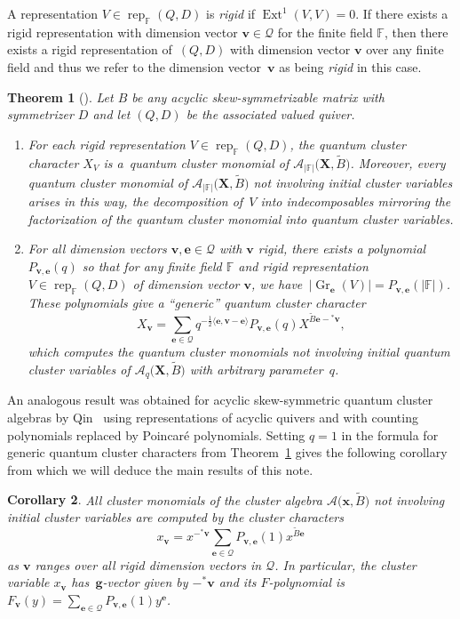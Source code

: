 \documentclass[pdftex]{sigma}
\newcommand{\bfe}{\mathbf{e}}
\newcommand{\bfg}{\mathbf{g}}
\newcommand{\bfv}{\mathbf{v}}
\newcommand{\bfx}{\mathbf{x}}
\newcommand{\bfX}{\mathbf{X}}
\newcommand{\cA}{\mathcal{A}}
\newcommand{\cQ}{\mathcal{Q}}
\newcommand{\FF}{\mathbb{F}}
\newcommand{\Ext}{\operatorname{Ext}}
\newcommand{\Gr}{\operatorname{Gr}}
\newcommand{\half}{{\frac{1}{2}}}
\newcommand{\rep}{\operatorname{rep}}
\numberwithin{equation}{section}
\newtheorem{Theorem}{Theorem}
\newtheorem{Corollary}[Theorem]{Corollary}
\begin{document}
 A representation $V\in\rep_\FF(Q,D)$ is {\it rigid} if $\Ext^1(V,V)=0$. If there exists a rigid representation with dimension vector $\bfv\in\cQ$ for the finite field $\FF$, then there exists a rigid representation of~$(Q,D)$ with dimension vector $\bfv$ over any finite field and thus we refer to the dimension vector~$\bfv$ as being {\it rigid} in this case.
 \begin{Theorem}[\cite{rupel1,rupel2}] \label{th:quantum cluster characters} Let $B$ be any acyclic skew-symmetrizable matrix with symmetrizer $D$ and let $(Q,D)$ be the associated valued quiver.
\begin{enumerate}\itemsep=0pt
\item[$(a)$] For each rigid representation $V\in\rep_\FF(Q,D)$, the quantum cluster character $X_V$ is a~quantum cluster monomial of $\cA_{|\FF|}\big(\bfX,\widetilde{B}\big)$. Moreover, every quantum cluster monomial of $\cA_{|\FF|}\big(\bfX,\widetilde{B}\big)$ not involving initial cluster variables arises in this way, the decomposition of~$V$ into indecomposables mirroring the factorization of the quantum cluster monomial into quantum cluster variables.
\item[$(b)$] For all dimension vectors $\bfv,\bfe\in\cQ$ with $\bfv$ rigid, there exists a polynomial $P_{\bfv,\bfe}(q)$ so that for any finite field $\FF$ and rigid representation $V\in\rep_\FF(Q,D)$ of dimension vector $\bfv$, we have~$|{\Gr}_\bfe(V)|=P_{\bfv,\bfe} (|\FF| )$. These polynomials give a ``generic'' quantum cluster character
 \[
 X_\bfv=\sum\limits_{\bfe\in\cQ} q^{-\half\langle\bfe,\bfv-\bfe\rangle}P_{\bfv,\bfe}(q)X^{\widetilde{B}\bfe-{}^*\bfv},
 \]
 which computes the quantum cluster monomials not involving initial quantum cluster va\-riab\-les of $\cA_q\big(\bfX,\widetilde{B}\big)$ with arbitrary parameter~$q$.
 \end{enumerate}
 \end{Theorem}
 An analogous result was obtained for acyclic skew-symmetric quantum cluster algebras by Qin~\cite{qin} using representations of acyclic quivers and with counting polynomials replaced by Poincar\'e polynomials. Setting $q=1$ in the formula for generic quantum cluster characters from Theorem~\ref{th:quantum cluster characters} gives the following corollary from which we will deduce the main results of this note.
 \begin{Corollary} \label{cor:classical cluster characters} All cluster monomials of the cluster algebra $\cA\big(\bfx,\widetilde{B}\big)$ not involving initial cluster variables are computed by the cluster characters
 \[
 x_\bfv = x^{-{}^*\bfv}\sum\limits_{\bfe\in\cQ} P_{\bfv,\bfe}(1)x^{\widetilde{B}\bfe}
 \]
 as $\bfv$ ranges over all rigid dimension vectors in $\cQ$. In particular, the cluster va\-riab\-le $x_\bfv$ has~$\bfg$-vector given by $-{}^*\bfv$ and its $F$-polynomial is $F_\bfv(y)=\sum\limits_{\bfe\in\cQ} P_{\bfv,\bfe}(1)y^\bfe$.
 \end{Corollary}
\end{document}
